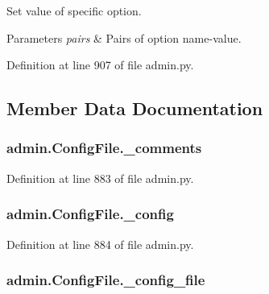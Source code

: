 Set value of specific option. 


\begin{DoxyParams}{Parameters}
{\em pairs} & Pairs of option name-\/value. \\
\hline
\end{DoxyParams}


Definition at line 907 of file admin.\-py.



\subsection{Member Data Documentation}
\hypertarget{classadmin_1_1ConfigFile_ac15829b16933412a7db88d3dacdcf345}{
\subsubsection[{\-\_\-comments}]{\setlength{\rightskip}{0pt plus 5cm}admin.\-Config\-File.\-\_\-comments\hspace{0.3cm}{\ttfamily [private]}}}\label{classadmin_1_1ConfigFile_ac15829b16933412a7db88d3dacdcf345}


Definition at line 883 of file admin.\-py.

\hypertarget{classadmin_1_1ConfigFile_a5a5c415d13ee87e1a03c9f64231a4fc9}{
\subsubsection[{\-\_\-config}]{\setlength{\rightskip}{0pt plus 5cm}admin.\-Config\-File.\-\_\-config\hspace{0.3cm}{\ttfamily [private]}}}\label{classadmin_1_1ConfigFile_a5a5c415d13ee87e1a03c9f64231a4fc9}


Definition at line 884 of file admin.\-py.

\hypertarget{classadmin_1_1ConfigFile_ada03146a25635d360b9994efcd3eb6ce}{
\subsubsection[{\-\_\-config\-\_\-file}]{\setlength{\rightskip}{0pt plus 5cm}admin.\-Config\-File.\-\_\-config\-\_\-file\hspace{0.3cm}{\ttfamily [private]}}}\label{classadmin_1_1ConfigFile_ada03146a25635d360b9994efcd3eb6ce}


